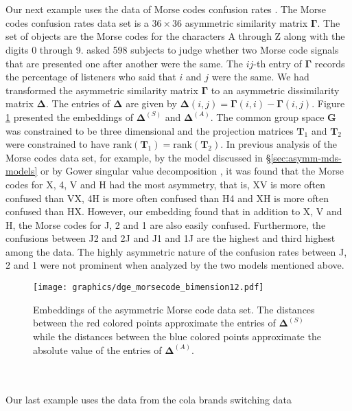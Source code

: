 \documentclass[11pt]{asaproc}
\begin{document}
\\ \\ \noindent Our next example uses the data of Morse codes
confusion rates \citep{rothkopf57}. The Morse codes confusion rates
data set is a $36 \times 36$ asymmetric similarity matrix
$\bm{\Gamma}$. The set of objects are the Morse codes for the
characters A through Z along with the digits 0 through
9. \citet{rothkopf57} asked 598 subjects to judge whether two Morse
code signals that are presented one after another were the same. The
$ij$-th entry of $\bm{\Gamma}$ records the percentage of listeners who
said that $i$ and $j$ were the same. We had transformed the asymmetric
similarity matrix $\bm{\Gamma}$ to an asymmetric dissimilarity matrix
$\bm{\Delta}$. The entries of $\bm{\Delta}$ are given by
$\bm{\Delta}(i,j) = \bm{\Gamma}(i,i) - \bm{\Gamma}(i,j)$. Figure
\ref{fig:morsecode} presented the embeddings of $\bm{\Delta}^{(S)}$
and $\bm{\Delta}^{(A)}$. The common group space $\mathbf{G}$ was
constrained to be three dimensional and the projection matrices
$\mathbf{T}_1$ and $\mathbf{T}_2$ were constrained to have
$\mathrm{rank}(\mathbf{T}_1) = \mathrm{rank}(\mathbf{T}_2)$. In
previous analysis of the Morse codes data set, for example, by the
model discussed in \S \ref{sec:asymm-mds-models} or by Gower singular
value decomposition \citet{gower77:_recen}, it was found that the
Morse codes for X, 4, V and H had the most asymmetry, that is, XV is
more often confused than VX, 4H is more often confused than H4 and XH
is more often confused than HX. However, our embedding found that in
addition to X, V and H, the Morse codes for J, 2 and 1 are also easily
confused. Furthermore, the confusions between J2 and 2J and J1 and 1J
are the highest and third highest among the data. The highly
asymmetric nature of the confusion rates between J, 2 and 1 were not
prominent when analyzed by the two models mentioned above.
\begin{figure}[htbp]
  \centering
    \texttt{[image: graphics/dge\_morsecode\_bimension12.pdf]}
    \caption{Embeddings of the asymmetric Morse code data set. The
      distances between the red colored points approximate the entries
      of $\bm{\Delta}^{(S)}$ while the distances between the blue
      colored points approximate the absolute value of the entries of
      $\bm{\Delta}^{(A)}$.}
  \label{fig:morsecode}
\end{figure}
\\ \\
\noindent
Our last example uses the data from the cola brands switching data
\end{document}
